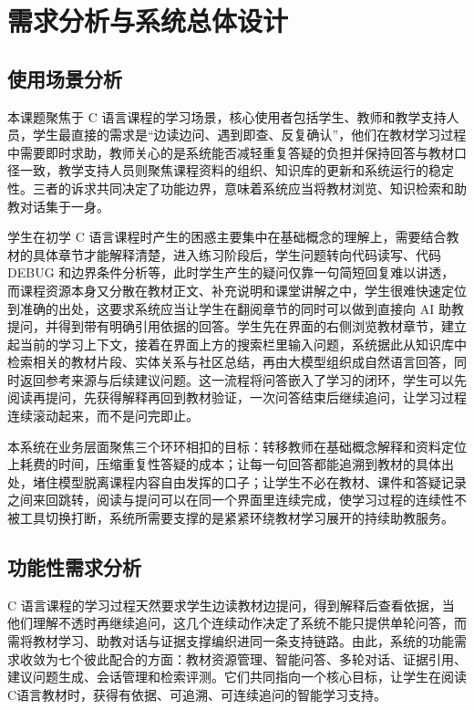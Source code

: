 \chapter{需求分析与系统总体设计}

\section{使用场景分析}
本课题聚焦于 C 语言课程的学习场景，核心使用者包括学生、教师和教学支持人员，学生最直接的需求是“边读边问、遇到即查、反复确认”，他们在教材学习过程中需要即时求助，教师关心的是系统能否减轻重复答疑的负担并保持回答与教材口径一致，教学支持人员则聚焦课程资料的组织、知识库的更新和系统运行的稳定性。三者的诉求共同决定了功能边界，意味着系统应当将教材浏览、知识检索和助教对话集于一身。

学生在初学 C 语言课程时产生的困惑主要集中在基础概念的理解上，需要结合教材的具体章节才能解释清楚，进入练习阶段后，学生问题转向代码读写、代码 DEBUG 和边界条件分析等，此时学生产生的疑问仅靠一句简短回复难以讲透，而课程资源本身又分散在教材正文、补充说明和课堂讲解之中，学生很难快速定位到准确的出处，这要求系统应当让学生在翻阅章节的同时可以做到直接向 AI 助教提问，并得到带有明确引用依据的回答。学生先在界面的右侧浏览教材章节，建立起当前的学习上下文，接着在界面上方的搜索栏里输入问题，系统据此从知识库中检索相关的教材片段、实体关系与社区总结，再由大模型组织成自然语言回答，同时返回参考来源与后续建议问题。这一流程将问答嵌入了学习的闭环，学生可以先阅读再提问，先获得解释再回到教材验证，一次问答结束后继续追问，让学习过程连续滚动起来，而不是问完即止。

本系统在业务层面聚焦三个环环相扣的目标：转移教师在基础概念解释和资料定位上耗费的时间，压缩重复性答疑的成本；让每一句回答都能追溯到教材的具体出处，堵住模型脱离课程内容自由发挥的口子；让学生不必在教材、课件和答疑记录之间来回跳转，阅读与提问可以在同一个界面里连续完成，使学习过程的连续性不被工具切换打断，系统所需要支撑的是紧紧环绕教材学习展开的持续助教服务。

\section{功能性需求分析}

C 语言课程的学习过程天然要求学生边读教材边提问，得到解释后查看依据，当他们理解不透时再继续追问，这几个连续动作决定了系统不能只提供单轮问答，而需将教材学习、助教对话与证据支撑编织进同一条支持链路。由此，系统的功能需求收敛为七个彼此配合的方面：教材资源管理、智能问答、多轮对话、证据引用、建议问题生成、会话管理和检索评测。它们共同指向一个核心目标，让学生在阅读C语言教材时，获得有依据、可追溯、可连续追问的智能学习支持。


